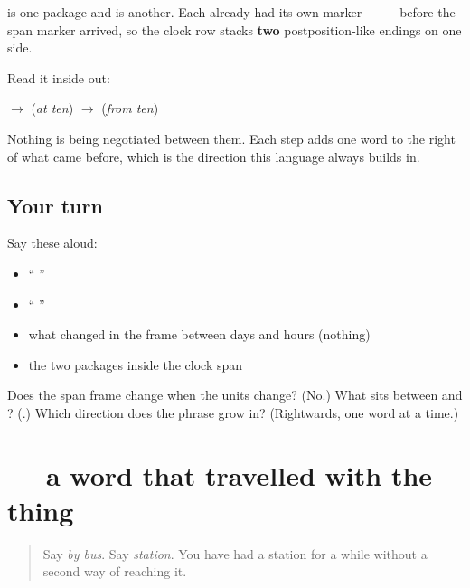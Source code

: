 \begin{grammarlens}[title={Grammar Lens: the clock row is two packages, not four words}]
\textbf{  } is one package and \textbf{  } is another. Each already had its own marker — \textbf{} — before the span marker arrived, so the clock row stacks \textbf{two} postposition-like endings on one side.

Read it inside out:

\textbf{} $\to$ \textbf{ } (\emph{at ten}) $\to$ \textbf{  } (\emph{from ten})

Nothing is being negotiated between them. Each step adds one word to the right of what came before, which is the direction this language always builds in.
\end{grammarlens}

\subsection*{Your turn}
Say these aloud:

\begin{itemize}
\raggedright
  \item \textquotedblleft{}   \textquotedblright{}
  \item \textquotedblleft{}     \textquotedblright{}
  \item what changed in the frame between days and hours (nothing)
  \item the two packages inside the clock span
\end{itemize}

\begin{tcolorbox}[breakable,colback=teal!4,colframe=teal!35!black,title={Before you move on}]
Does the span frame change when the units change? (No.) What sits between \textbf{} and \textbf{}? (\textbf{}.) Which direction does the phrase grow in? (Rightwards, one word at a time.)
\end{tcolorbox}
\section[\texorpdfstring{\hi{ट्रेन} (ṭren)}{ट्रेन (ṭren)}]{ — a word that travelled with the thing}

\label{lesson:HI-C94-train}



\begin{quote}
Say \emph{by bus}. Say \emph{station}. You have had a station for a while without a second way of reaching it.
\end{quote}

